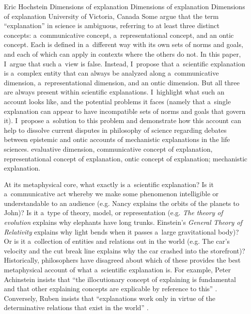 \begin{artengenv}{Eric Hochstein}
	{Dimensions of explanation}
	{Dimensions of explanation}
	{Dimensions of explanation}
	{University of Victoria, Canada}
	{Some argue that the term ``explanation'' in science is ambiguous, referring to at least three distinct concepts: a~communicative concept, a~representational concept, and an ontic concept. Each is defined in a~different way with its own sets of norms and goals, and each of which can apply in contexts where the others do not. In this paper, I~argue that such a~view is false. Instead, I~propose that a~scientific explanation is a~complex entity that can always be analyzed along a~communicative dimension, a~representational dimension, and an ontic dimension. But all three are always present within scientific explanations. I~highlight what such an account looks like, and the potential problems it faces (namely that a~single explanation can appear to have incompatible sets of norms and goals that govern it). I~propose a~solution to this problem and demonstrate how this account can help to dissolve current disputes in philosophy of science regarding debates between epistemic and ontic accounts of mechanistic explanations in the life sciences.
	}
	{evaluative dimension, communicative concept of explanation, representational concept of explanation, ontic concept of explanation; mechanistic explanation.}




\lettrine[loversize=0.13,lines=2,lraise=-0.03,nindent=0em,findent=0.2pt]%
{A}{}t its metaphysical core, what exactly is a~scientific explanation? Is it a~communicative act whereby we make some phenomenon intelligible or understandable to an audience (e.g. Nancy explains the orbits of the planets to John)? Is it a~type of theory, model, or representation (e.g. \textit{The theory of evolution} explains why elephants have long trunks. Einstein's \textit{General Theory of} \textit{Relativity} explains why light bends when it passes a~large gravitational body)? Or is it a~collection of entities and relations out in the world (e.g. The car's velocity and the cut break line explains why the car crashed into the storefront)? Historically, philosophers have disagreed about which of these provides the best metaphysical account of what a~scientific explanation is. For example, Peter Achinstein insists that ``the illocutionary concept of explaining is fundamental and that other explaining concepts are explicable by reference to this''
\parencite*[][p.22]{achinstein_pragmatic_1984}. %
 Conversely, Ruben insists that ``explanations work only in virtue of the determinative relations that exist in the world'' 
\parencite[][p.231]{ruben_explaining_1990}.%



\end{artengenv}

